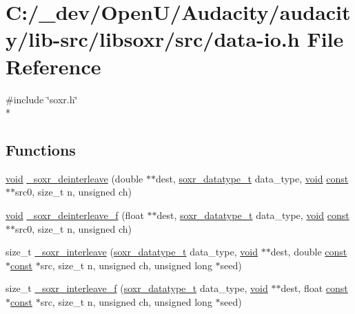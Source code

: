 \hypertarget{data-io_8h}{}\section{C\+:/\+\_\+dev/\+Open\+U/\+Audacity/audacity/lib-\/src/libsoxr/src/data-\/io.h File Reference}
\label{data-io_8h}
{\ttfamily \#include \char`\"{}soxr.\+h\char`\"{}}\\*
\subsection*{Functions}
\begin{DoxyCompactItemize}
\item 
\hyperlink{sound_8c_ae35f5844602719cf66324f4de2a658b3}{void} \hyperlink{data-io_8h_a3e2562473faf84d3a9210f5ec4922fb2}{\+\_\+soxr\+\_\+deinterleave} (double $\ast$$\ast$dest, \hyperlink{soxr_8h_ac648d3d2dd7b1988e631d6205e73f66d}{soxr\+\_\+datatype\+\_\+t} data\+\_\+type, \hyperlink{sound_8c_ae35f5844602719cf66324f4de2a658b3}{void} \hyperlink{getopt1_8c_a2c212835823e3c54a8ab6d95c652660e}{const} $\ast$$\ast$src0, size\+\_\+t n, unsigned ch)
\item 
\hyperlink{sound_8c_ae35f5844602719cf66324f4de2a658b3}{void} \hyperlink{data-io_8h_ae52e823e505bcd1b46a7a5e1888b3e16}{\+\_\+soxr\+\_\+deinterleave\+\_\+f} (float $\ast$$\ast$dest, \hyperlink{soxr_8h_ac648d3d2dd7b1988e631d6205e73f66d}{soxr\+\_\+datatype\+\_\+t} data\+\_\+type, \hyperlink{sound_8c_ae35f5844602719cf66324f4de2a658b3}{void} \hyperlink{getopt1_8c_a2c212835823e3c54a8ab6d95c652660e}{const} $\ast$$\ast$src0, size\+\_\+t n, unsigned ch)
\item 
size\+\_\+t \hyperlink{data-io_8h_a8cf548e4d094401e15dd78380be62644}{\+\_\+soxr\+\_\+interleave} (\hyperlink{soxr_8h_ac648d3d2dd7b1988e631d6205e73f66d}{soxr\+\_\+datatype\+\_\+t} data\+\_\+type, \hyperlink{sound_8c_ae35f5844602719cf66324f4de2a658b3}{void} $\ast$$\ast$dest, double \hyperlink{getopt1_8c_a2c212835823e3c54a8ab6d95c652660e}{const} $\ast$\hyperlink{getopt1_8c_a2c212835823e3c54a8ab6d95c652660e}{const} $\ast$src, size\+\_\+t n, unsigned ch, unsigned long $\ast$seed)
\item 
size\+\_\+t \hyperlink{data-io_8h_aa94e9c0f89c276eb61d6abc0207ff3f3}{\+\_\+soxr\+\_\+interleave\+\_\+f} (\hyperlink{soxr_8h_ac648d3d2dd7b1988e631d6205e73f66d}{soxr\+\_\+datatype\+\_\+t} data\+\_\+type, \hyperlink{sound_8c_ae35f5844602719cf66324f4de2a658b3}{void} $\ast$$\ast$dest, float \hyperlink{getopt1_8c_a2c212835823e3c54a8ab6d95c652660e}{const} $\ast$\hyperlink{getopt1_8c_a2c212835823e3c54a8ab6d95c652660e}{const} $\ast$src, size\+\_\+t n, unsigned ch, unsigned long $\ast$seed)
\end{DoxyCompactItemize}


